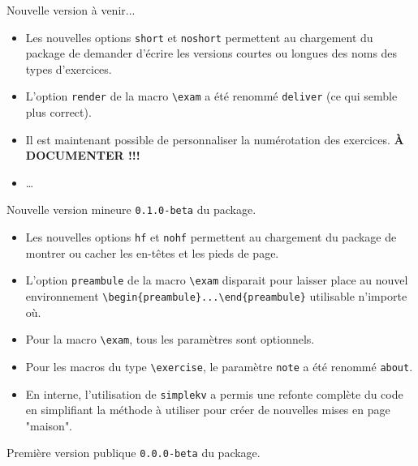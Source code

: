 \documentclass[12pt,a4paper]{scrartcl}
\theoremstyle{definition}
\begin{document}
\begin{description}[leftmargin=1em]
	\setlength\itemsep{1em}

	\item[À SUIVRE !] Nouvelle version à venir...
	\begin{itemize}
        \item Les nouvelles options \verb+short+ et \verb+noshort+ permettent au chargement du package de demander d'écrire les versions courtes ou longues des noms des types d'exercices.

        \item L'option \verb+render+ de la macro \verb+\exam+ a été renommé \verb+deliver+ (ce qui semble plus correct).

        \item Il est maintenant possible de personnaliser la numérotation des exercices.   \textbf{À DOCUMENTER !!!}


        \item \dots
	\end{itemize}

	\item[2017-11-12] Nouvelle version mineure \verb+0.1.0-beta+ du package.
	\begin{itemize}
        \item Les nouvelles options \verb+hf+ et \verb+nohf+ permettent au chargement du package de montrer ou cacher les en-têtes et les pieds de page.

        \item L'option \verb+preambule+ de la macro \verb+\exam+ disparait pour laisser place au nouvel environnement \verb+\begin{preambule}...\end{preambule}+ utilisable n'importe où.

        \item Pour la macro \verb+\exam+, tous les paramètres sont optionnels.

        \item Pour les macros du type \verb+\exercise+, le paramètre \verb+note+ a été renommé \verb+about+.

		\item En interne, l'utilisation de \verb+simplekv+ a permis une refonte complète du code en simplifiant la méthode à utiliser pour créer de nouvelles mises en page "maison".
	\end{itemize}

	\item[2017-11-03] Première version publique \verb+0.0.0-beta+ du package.
\end{description}
\end{document}
